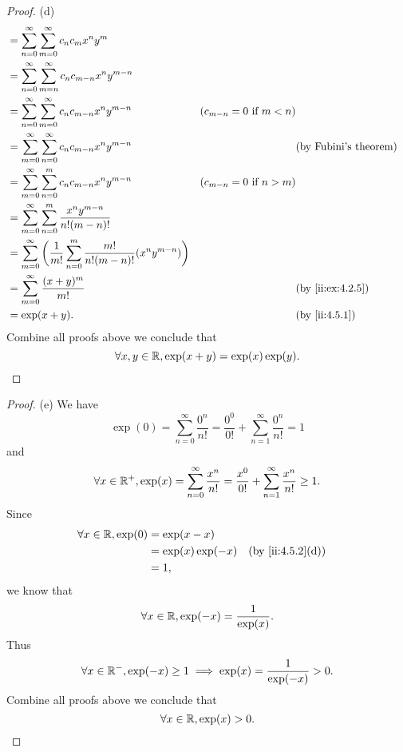 \begin{proof}{(d)}
\begin{align*}
     & = \sum_{n = 0}^\infty \sum_{m = 0}^\infty c_n c_m x^n y^m                                                                                                                 \\
     & = \sum_{n = 0}^\infty \sum_{m = n}^\infty c_n c_{m - n} x^n y^{m - n}                                                                                                     \\
     & = \sum_{n = 0}^\infty \sum_{m = 0}^\infty c_n c_{m - n} x^n y^{m - n}                                  & (c_{m - n} = 0 \text{ if } m < n)                                \\
     & = \sum_{m = 0}^\infty \sum_{n = 0}^\infty c_n c_{m - n} x^n y^{m - n}                                  &                                   & \text{(by Fubini's theorem)} \\
     & = \sum_{m = 0}^\infty \sum_{n = 0}^m c_n c_{m - n} x^n y^{m - n}                                       & (c_{m - n} = 0 \text{ if } n > m)                                \\
     & = \sum_{m = 0}^\infty \sum_{n = 0}^m \dfrac{x^n y^{m - n}}{n! (m - n)!}                                                                                                   \\
     & = \sum_{m = 0}^\infty \bigg(\dfrac{1}{m!} \sum_{n = 0}^m \dfrac{m!}{n! (m - n)!} (x^n y^{m - n})\bigg)                                                                    \\
     & = \sum_{m = 0}^\infty \dfrac{(x + y)^m}{m!}                                                            &                                   & \by{ii:ex:4.2.5}             \\
     & = \exp(x + y).                                                                                         &                                   & \by{ii:4.5.1}
  \end{align*}
  Combine all proofs above we conclude that
  \[
    \forall x, y \in \mathbb{R}, \exp(x + y) = \exp(x) \exp(y).
  \]
\end{proof}

\begin{proof}{(e)}
  We have
  \[
    \exp(0) = \sum_{n = 0}^\infty \dfrac{0^n}{n!} = \dfrac{0^0}{0!} + \sum_{n = 1}^\infty \dfrac{0^n}{n!} = 1
  \]
  and
  \[
    \forall x \in \mathbb{R}^+, \exp(x) = \sum_{n = 0}^\infty \dfrac{x^n}{n!} = \dfrac{x^0}{0!} + \sum_{n = 1}^\infty \dfrac{x^n}{n!} \geq 1.
  \]
  Since
  \begin{align*}
    \forall x \in \R, \exp(0) & = \exp(x - x)                            \\
                              & = \exp(x) \exp(-x) &  & \by{ii:4.5.2}[d] \\
                              & = 1,
  \end{align*}
  we know that
  \[
    \forall x \in \mathbb{R}, \exp(-x) = \dfrac{1}{\exp(x)}.
  \]
  Thus
  \[
    \forall x \in \mathbb{R}^-, \exp(-x) \geq 1 \implies \exp(x) = \dfrac{1}{\exp(-x)} > 0.
  \]
  Combine all proofs above we conclude that
  \[
    \forall x \in \mathbb{R}, \exp(x) > 0.
  \]
\end{proof}

